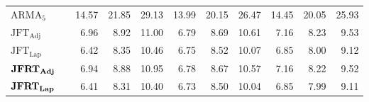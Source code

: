 \documentclass[a4paper, 12pt]{article}
\begin{document}
\begin{table}[ht]
{\begin{tabular}{@{}llrrrrrrrrr@{}}
			\(\text{ARMA}_5\)                              &                                       & 14.57                         & 21.85                         & 29.13                          & 13.99    & 20.15    & 26.47    & 14.45    & 20.05    & 25.93    \\
			\(\text{JFT}_{\text{Adj}}\)                    &                                       & 6.96                          & 8.92                          & 11.00                          & 6.79     & 8.69     & 10.61    & 7.16     & 8.23     & 9.53     \\
			\(\text{JFT}_{\text{Lap}}\)                    &                                       & 6.42                          & 8.35                          & 10.46                          & 6.75     & 8.52     & 10.07    & 6.85     & 8.00     & 9.12     \\
			\(\text{\textbf{JFRT}}_{\text{\textbf{Adj}}}\) &                                       & 6.94                          & 8.88                          & 10.95                          & 6.78     & 8.67     & 10.57    & 7.16     & 8.22     & 9.52     \\
			\(\text{\textbf{JFRT}}_{\text{\textbf{Lap}}}\) &                                       & 6.41                          & 8.31                          & 10.40                          & 6.73     & 8.50     & 10.04    & 6.85     & 7.99     & 9.11     \\  \bottomrule
		\end{tabular}
	}
\end{table}
\end{document}

